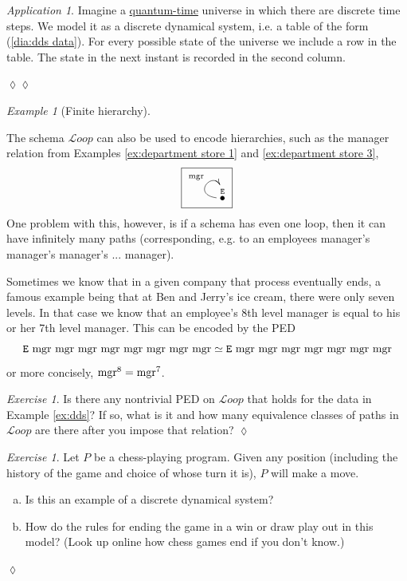 \documentclass{book}
\def\tn{\textnormal}
\def\mc{\mathcal}
\newcommand{\LTO}[1]{\stackrel{\tt{#1}}{\bullet}}
\def\mcL{\mc{L}}
\def\Loop{{\mcL oop}}
\theoremstyle{remark}
\newtheorem{example}[subsubsection]{Example}
\newtheorem{exc}[subsubsection]{Exercise}
\newenvironment{exercise}{\begin{exc}}{\hspace*{\fill}$\lozenge$\end{exc}}
\newtheorem{app}[subsubsection]{Application}
\newenvironment{application}{\begin{app}}{\hspace*{\fill}$\lozenge\lozenge$\end{app}}
\theoremstyle{definition}
\def\sexc{\begin{enumerate}[a.)]\setlength{\itemsep}{.1cm}\setlength{\parskip}{.1cm}\item}
\def\next{\item}
\def\endsexc{\end{enumerate}}
\begin{document}
\begin{application}

Imagine a \href{http://en.wikipedia.org/wiki/Chronon}{\text quantum-time} universe in which there are discrete time steps. We model it as a discrete dynamical system, i.e. a table of the form (\ref{dia:dds data}). For every possible state of the universe we include a row in the table. The state in the next instant is recorded in the second column.

\end{application}

\begin{example}[Finite hierarchy]\label{ex:finite hierarchy}

The schema $\Loop$ can also be used to encode hierarchies, such as the manager relation from Examples \ref{ex:department store 1} and \ref{ex:department store 3}, 
$$\fbox{\xymatrix{\LTO{E}\ar@(l,u)[]^{\tn{mgr}}}}$$
One problem with this, however, is if a schema has even one loop, then it can have infinitely many paths (corresponding, e.g. to an employees manager's manager's manager's ... manager). 

Sometimes we know that in a given company that process eventually ends, a famous example being that at Ben and Jerry's ice cream, there were only seven levels. In that case we know that an employee's 8th level manager is equal to his or her 7th level manager. This can be encoded by the PED $${\tt E} \tn{ mgr}\tn{ mgr}\tn{ mgr}\tn{ mgr}\tn{ mgr}\tn{ mgr}\tn{ mgr}\tn{ mgr}\simeq{\tt E}\tn{ mgr}\tn{ mgr}\tn{ mgr}\tn{ mgr}\tn{ mgr}\tn{ mgr}\tn{ mgr}$$ or more concisely, $\tn{mgr}^8=\tn{mgr}^7$.

\end{example}

\begin{exercise}
Is there any nontrivial PED on $\Loop$ that holds for the data in Example \ref{ex:dds}? If so, what is it and how many equivalence classes of paths in $\Loop$ are there after you impose that relation?
\end{exercise}

\begin{exercise}
Let $P$ be a chess-playing program. Given any position (including the history of the game and choice of whose turn it is), $P$ will make a move. 
\sexc Is this an example of a discrete dynamical system? 
\next How do the rules for ending the game in a win or draw play out in this model? (Look up online how chess games end if you don't know.)
\endsexc
\end{exercise}
\end{document}
